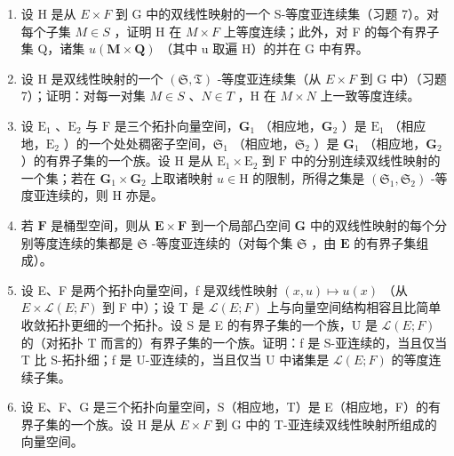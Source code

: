 \begin{enumerate}
\def\labelenumi{\arabic{enumi})}
\setcounter{enumi}{7}
\item
  设 H 是从 \(E \times F\) 到 G 中的双线性映射的一个 S-等度亚连续集（习题 7）。对每个子集 \(M \in S\) ，证明 H 在 \(M \times F\) 上等度连续；此外，对 F 的每个有界子集 Q，诸集 \(u(\mathbf{M} \times \mathbf{Q})\) （其中 u 取遍 H）的并在 G 中有界。
\item
  设 H 是双线性映射的一个 \((\mathfrak{S}, \mathfrak{T})\) -等度亚连续集（从 \(E \times F\) 到 G 中）（习题 7）；证明：对每一对集 \(M \in S\) 、\(N \in T\) ，H 在 \(M \times N\) 上一致等度连续。
\item
  设 \(\mathrm{E}_1\) 、\(\mathrm{E}_2\) 与 \(\mathrm{F}\) 是三个拓扑向量空间，\(\mathbf{G}_1\) （相应地，\(\mathbf{G}_2\) ）是 \(\mathrm{E}_1\) （相应地，\(\mathrm{E}_2\) ）的一个处处稠密子空间，\(\mathfrak{S}_1\) （相应地，\(\mathfrak{S}_2\) ）是 \(\mathbf{G}_1\) （相应地，\(\mathbf{G}_2\) ）的有界子集的一个族。设 \(\mathrm{H}\) 是从 \(\mathrm{E}_1 \times \mathrm{E}_2\) 到 \(\mathrm{F}\) 中的分别连续双线性映射的一个集；若在 \(\mathbf{G}_1 \times \mathbf{G}_2\) 上取诸映射 \(u \in \mathrm{H}\) 的限制，所得之集是 \((\mathfrak{S}_1, \mathfrak{S}_2)\) -等度亚连续的，则 \(\mathrm{H}\) 亦是。
\item
  若 \(\mathbf{F}\) 是桶型空间，则从 \(\mathbf{E} \times \mathbf{F}\) 到一个局部凸空间 \(\mathbf{G}\) 中的双线性映射的每个分别等度连续的集都是 \(\mathfrak{S}\) -等度亚连续的（对每个集 \(\mathfrak{S}\) ，由 \(\mathbf{E}\) 的有界子集组成）。
\item
  设 E、F 是两个拓扑向量空间，f 是双线性映射 \((x, u) \mapsto u(x)\) （从 \(E \times \mathcal{L}(E; F)\) 到 F 中）；设 T 是 \(\mathcal{L}(E; F)\) 上与向量空间结构相容且比简单收敛拓扑更细的一个拓扑。设 S 是 E 的有界子集的一个族，U 是 \(\mathcal{L}(E; F)\) 的（对拓扑 T 而言的）有界子集的一个族。证明：f 是 S-亚连续的，当且仅当 T 比 S-拓扑细；f 是 U-亚连续的，当且仅当 U 中诸集是 \(\mathcal{L}(E; F)\) 的等度连续子集。
\item
  设 E、F、G 是三个拓扑向量空间，S（相应地，T）是 E（相应地，F）的有界子集的一个族。设 H 是从 \(E \times F\) 到 G 中的 T-亚连续双线性映射所组成的向量空间。
\end{enumerate}

